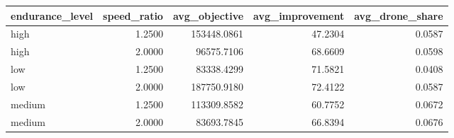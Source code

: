\begin{tabular}{lrrrr}
\toprule
endurance_level & speed_ratio & avg_objective & avg_improvement & avg_drone_share \\
\midrule
high & 1.2500 & 153448.0861 & 47.2304 & 0.0587 \\
high & 2.0000 & 96575.7106 & 68.6609 & 0.0598 \\
low & 1.2500 & 83338.4299 & 71.5821 & 0.0408 \\
low & 2.0000 & 187750.9180 & 72.4122 & 0.0587 \\
medium & 1.2500 & 113309.8582 & 60.7752 & 0.0672 \\
medium & 2.0000 & 83693.7845 & 66.8394 & 0.0676 \\
\bottomrule
\end{tabular}
